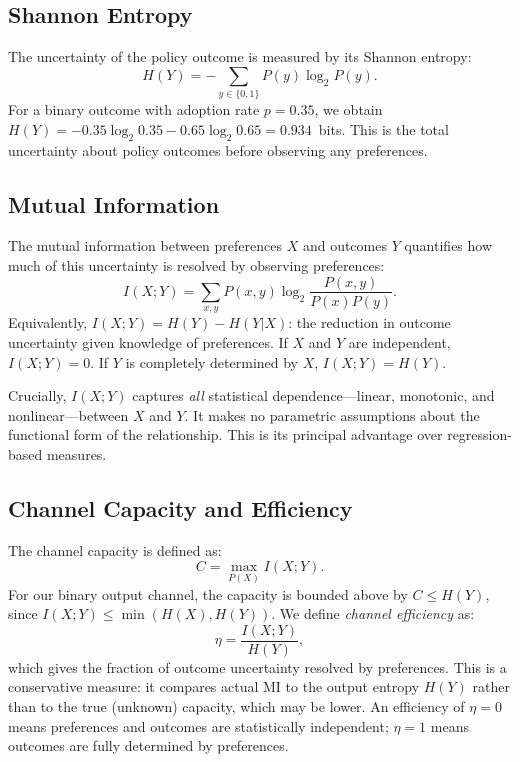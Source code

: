 \documentclass[twocolumn,10pt]{article}
\begin{document}
\subsection{Shannon Entropy}

The uncertainty of the policy outcome is measured by its Shannon entropy:
\begin{equation}
H(Y) = -\sum_{y \in \{0,1\}} P(y) \log_2 P(y).
\label{eq:entropy}
\end{equation}
For a binary outcome with adoption rate $p = 0.35$, we obtain $H(Y) = -0.35\log_2 0.35 - 0.65\log_2 0.65 = 0.934$~bits.  This is the total uncertainty about policy outcomes before observing any preferences.

\subsection{Mutual Information}

The mutual information between preferences $X$ and outcomes $Y$ quantifies how much of this uncertainty is resolved by observing preferences:
\begin{equation}
I(X;Y) = \sum_{x,y} P(x,y) \log_2 \frac{P(x,y)}{P(x)P(y)}.
\label{eq:mi}
\end{equation}
Equivalently, $I(X;Y) = H(Y) - H(Y|X)$: the reduction in outcome uncertainty given knowledge of preferences.  If $X$ and $Y$ are independent, $I(X;Y) = 0$.  If $Y$ is completely determined by $X$, $I(X;Y) = H(Y)$.

Crucially, $I(X;Y)$ captures \emph{all} statistical dependence---linear, monotonic, and nonlinear---between $X$ and $Y$.  It makes no parametric assumptions about the functional form of the relationship.  This is its principal advantage over regression-based measures.

\subsection{Channel Capacity and Efficiency}

The channel capacity is defined as:
\begin{equation}
C = \max_{P(X)} I(X;Y).
\label{eq:capacity}
\end{equation}
For our binary output channel, the capacity is bounded above by $C \leq H(Y)$, since $I(X;Y) \leq \min(H(X), H(Y))$.  We define \emph{channel efficiency} as:
\begin{equation}
\eta = \frac{I(X;Y)}{H(Y)},
\label{eq:efficiency}
\end{equation}
which gives the fraction of outcome uncertainty resolved by preferences.  This is a conservative measure: it compares actual MI to the output entropy $H(Y)$ rather than to the true (unknown) capacity, which may be lower.  An efficiency of $\eta = 0$ means preferences and outcomes are statistically independent; $\eta = 1$ means outcomes are fully determined by preferences.
\end{document}
